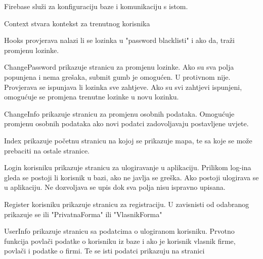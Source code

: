 	        Firebase služi za konfiguraciju baze i komunikaciju s istom. 
	        
	        Context stvara kontekst za trenutnog korisnika
	        
	        Hooks provjerava nalazi li se lozinka u "password blacklisti" i ako da, traži promjenu lozinke.

             ChangePassword prikazuje stranicu za promjenu lozinke. Ako su sva polja popunjena i nema grešaka, submit gumb je omogućen. U protivnom nije. Provjerava se ispunjava li lozinka sve zahtjeve. Ako su svi zahtjevi ispunjeni, omogućuje se promjena trenutne lozinke u novu lozinku.
    
             ChangeInfo prikazuje stranicu za promjenu osobnih podataka. Omogućuje promjenu osobnih podataka ako novi podatci zadovoljavaju postavljene uvjete. 

            Index prikazuje početnu stranicu na kojoj se prikazuje mapa, te sa koje se može prebaciti na ostale stranice.
            
	        Login korisniku prikazuje stranicu za ulogiravanje u aplikaciju. Prilikom log-ina gleda se postoji li korisnik u bazi, ako ne javlja se greška. Ako postoji ulogirava se u aplikaciju. Ne dozvoljava se upis dok sva polja nisu ispravno upisana.
	        
	        Register korisniku prikazuje stranicu za registraciju. U zavisnisti od odabranog prikazuje se ili "PrivatnaForma" ili "VlasnikForma"
	        
	        UserInfo prikazuje stranicu sa podatcima o ulogiranom korisniku. Prvotno funkcija povlači podatke o korisniku iz baze i ako je korisnik vlasnik firme, povlači i podatke o firmi. Te se isti podatci prikazuju na stranici

            
         
